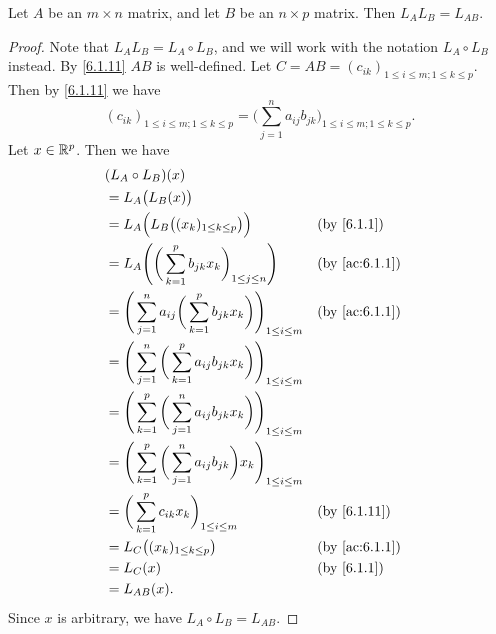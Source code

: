 \begin{lem}\label{6.1.16}
  Let \(A\) be an \(m \times n\) matrix, and let \(B\) be an \(n \times p\) matrix.
  Then \(L_A L_B = L_{AB}\).
\end{lem}

\begin{proof}
  Note that \(L_A L_B = L_A \circ L_B\), and we will work with the notation \(L_A \circ L_B\) instead.
  By \cref{6.1.11} \(AB\) is well-defined.
  Let \(C = AB = (c_{ik})_{1 \leq i \leq m ; 1 \leq k \leq p}\).
  Then by \cref{6.1.11} we have
  \[
    (c_{ik})_{1 \leq i \leq m ; 1 \leq k \leq p} = \bigg(\sum_{j = 1}^n a_{ij} b_{jk}\bigg)_{1 \leq i \leq m ; 1 \leq k \leq p}.
  \]
  Let \(x \in \mathbb{R}^p\).
  Then we have
  \begin{align*}
     & (L_A \circ L_B)(x)                                                                                                           \\
     & = L_A\big(L_B(x)\big)                                                                                                        \\
     & = L_A\Big(L_B\big((x_k)_{1 \leq k \leq p}\big)\Big)                                         &  & \text{(by \cref{6.1.1})}    \\
     & = L_A\Bigg(\bigg(\sum_{k = 1}^p b_{jk} x_k\bigg)_{1 \leq j \leq n}\Bigg)                    &  & \text{(by \cref{ac:6.1.1})} \\
     & = \Bigg(\sum_{j = 1}^n a_{ij} \bigg(\sum_{k = 1}^p b_{jk} x_k\bigg)\Bigg)_{1 \leq i \leq m} &  & \text{(by \cref{ac:6.1.1})} \\
     & = \Bigg(\sum_{j = 1}^n \bigg(\sum_{k = 1}^p a_{ij} b_{jk} x_k\bigg)\Bigg)_{1 \leq i \leq m}                                  \\
     & = \Bigg(\sum_{k = 1}^p \bigg(\sum_{j = 1}^n a_{ij} b_{jk} x_k\bigg)\Bigg)_{1 \leq i \leq m}                                  \\
     & = \Bigg(\sum_{k = 1}^p \bigg(\sum_{j = 1}^n a_{ij} b_{jk}\bigg) x_k\Bigg)_{1 \leq i \leq m}                                  \\
     & = \bigg(\sum_{k = 1}^p c_{ik} x_k\bigg)_{1 \leq i \leq m}                                   &  & \text{(by \cref{6.1.11})}   \\
     & = L_C\big((x_k)_{1 \leq k \leq p}\big)                                                      &  & \text{(by \cref{ac:6.1.1})} \\
     & = L_C(x)                                                                                    &  & \text{(by \cref{6.1.1})}    \\
     & = L_{AB}(x).
  \end{align*}
  Since \(x\) is arbitrary, we have \(L_A \circ L_B = L_{AB}\).
\end{proof}

